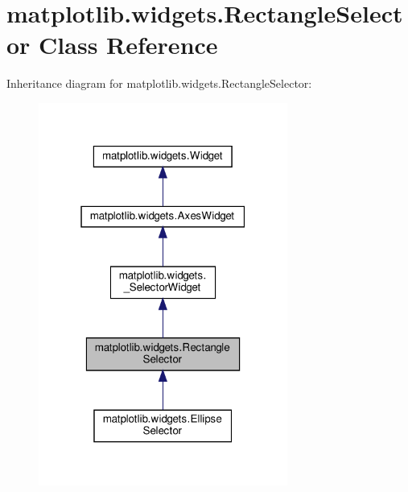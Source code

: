 \hypertarget{classmatplotlib_1_1widgets_1_1RectangleSelector}{}\section{matplotlib.\+widgets.\+Rectangle\+Selector Class Reference}
\label{classmatplotlib_1_1widgets_1_1RectangleSelector}


Inheritance diagram for matplotlib.\+widgets.\+Rectangle\+Selector\+:
\nopagebreak
\begin{figure}[H]
\begin{center}
\leavevmode
\includegraphics[width=232pt]{classmatplotlib_1_1widgets_1_1RectangleSelector__inherit__graph}
\end{center}
\end{figure}



